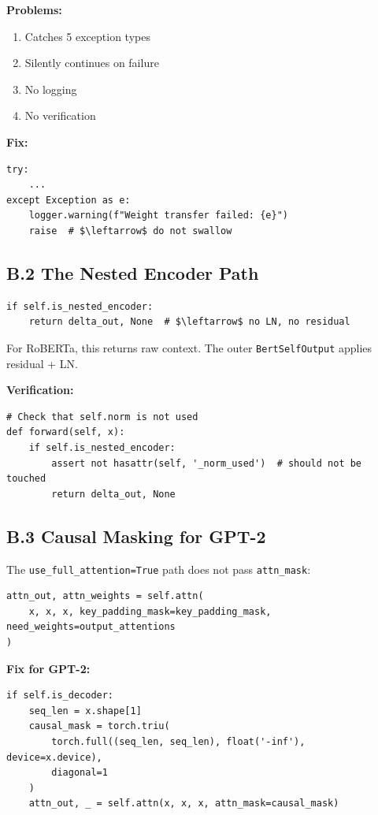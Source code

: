 \textbf{Problems:}
\begin{enumerate}
\item Catches 5 exception types
\item Silently continues on failure
\item No logging
\item No verification

\end{enumerate}
\textbf{Fix:}

\begin{lstlisting}
try:
    ...
except Exception as e:
    logger.warning(f"Weight transfer failed: {e}")
    raise  # $\leftarrow$ do not swallow
\end{lstlisting}

\subsection{B.2 The Nested Encoder Path}

\begin{lstlisting}
if self.is_nested_encoder:
    return delta_out, None  # $\leftarrow$ no LN, no residual
\end{lstlisting}

For RoBERTa, this returns raw context. The outer \texttt{BertSelfOutput} applies 
residual + LN.

\textbf{Verification:}

\begin{lstlisting}
# Check that self.norm is not used
def forward(self, x):
    if self.is_nested_encoder:
        assert not hasattr(self, '_norm_used')  # should not be touched
        return delta_out, None
\end{lstlisting}

\subsection{B.3 Causal Masking for GPT-2}

The \texttt{use\_full\_attention=True} path does not pass \texttt{attn\_mask}:

\begin{lstlisting}
attn_out, attn_weights = self.attn(
    x, x, x, key_padding_mask=key_padding_mask, need_weights=output_attentions
)
\end{lstlisting}

\textbf{Fix for GPT-2:}

\begin{lstlisting}
if self.is_decoder:
    seq_len = x.shape[1]
    causal_mask = torch.triu(
        torch.full((seq_len, seq_len), float('-inf'), device=x.device),
        diagonal=1
    )
    attn_out, _ = self.attn(x, x, x, attn_mask=causal_mask)
\end{lstlisting}

